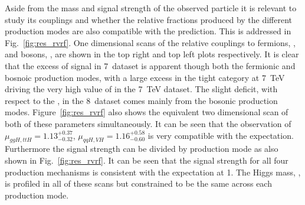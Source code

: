 Aside from the mass and signal strength of the observed particle it is relevant to study its couplings and whether the relative fractions produced by the different production modes are also compatible with the \SM prediction. This is addressed in Fig.~\ref{fig:res_rvrf}. One dimensional \NLL scans of the relative couplings to fermions, \RF, and bosons, \RV, are shown in the top right and top left plots respectively. It is clear that the excess of signal in 7~\TeV dataset is apparent though both the fermionic and bosnoic production modes, with a large excess in the tight \VBF category at 7~TeV driving the very high value of \RV in the 7~TeV dataset. The slight deficit, with respect to the \SM, in the 8~\TeV dataset comes mainly from the bosonic production modes. Figure~\ref{fig:res_rvrf} also shows the equivalent two dimensional \NLL scan of both of these parameters simultaneously. It can be seen that the observation of $\mu_{ggH,ttH}=1.13^{+0.37}_{-0.32}$, $\mu_{qqH,VH}=1.16^{+0.58}_{-0.60}$ is very compatible with the \SM expectation. Furthermore the signal strength can be divided by production mode as also shown in Fig.~\ref{fig:res_rvrf}. It can be seen that the signal strength for all four production mechanisms is consistent with the \SM expectation at 1. The Higgs mass, \mH, is profiled in all of these scans but constrained to be the same across each production mode.

